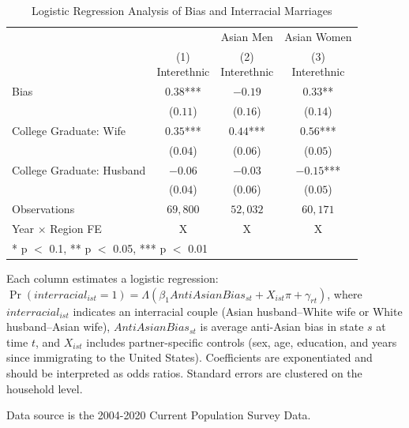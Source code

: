 \begin{table}[H]
\centering\centering
\caption{Logistic Regression Analysis of Bias and Interracial Marriages \label{regtab-logit-03}}
\centering
\begin{threeparttable}
\begin{tabular}[t]{lccc}
\toprule
\multicolumn{2}{c}{ } & \multicolumn{1}{c}{Asian Men} & \multicolumn{1}{c}{Asian Women} \\
\cmidrule(l{3pt}r{3pt}){3-3} \cmidrule(l{3pt}r{3pt}){4-4}
  & \specialcell{(1) \\ Interethnic} & \specialcell{(2) \\ Interethnic} & \specialcell{(3) \\ Interethnic}\\
\midrule
Bias & $0.38$*** & $-0.19$ & $0.33$**\\
 & ($0.11$) & ($0.16$) & ($0.14$)\\
College Graduate: Wife & $0.35$*** & $0.44$*** & $0.56$***\\
 & ($0.04$) & ($0.06$) & \vphantom{1} ($0.05$)\\
College Graduate: Husband & $-0.06$ & $-0.03$ & $-0.15$***\\
 & ($0.04$) & ($0.06$) & ($0.05$)\\
\midrule
Observations & $69,800$ & $52,032$ & $60,171$\\
Year $\times$ Region FE & X & X & X\\
\bottomrule
\multicolumn{4}{l}{\rule{0pt}{1em}* p $<$ 0.1, ** p $<$ 0.05, *** p $<$ 0.01}\\
\end{tabular}
\begin{tablenotes}
\small
\item[1] \footnotesize{Each column estimates a logistic regression: $\Pr(interracial_{ist} = 1) = \Lambda(\beta_1 AntiAsianBias_{st} + X_{ist}\pi + \gamma_{rt})$, where $interracial_{ist}$ indicates an interracial couple (Asian husband--White wife or White husband--Asian wife), $AntiAsianBias_{st}$ is average anti-Asian bias in state $s$ at time $t$, and $X_{ist}$ includes partner-specific controls (sex, age, education, and years since immigrating to the United States). Coefficients are exponentiated and should be interpreted as odds ratios. Standard errors are clustered on the household level.}
\item[3] \footnotesize{Data source is the 2004-2020 Current Population Survey Data.}
\end{tablenotes}
\end{threeparttable}
\end{table}
